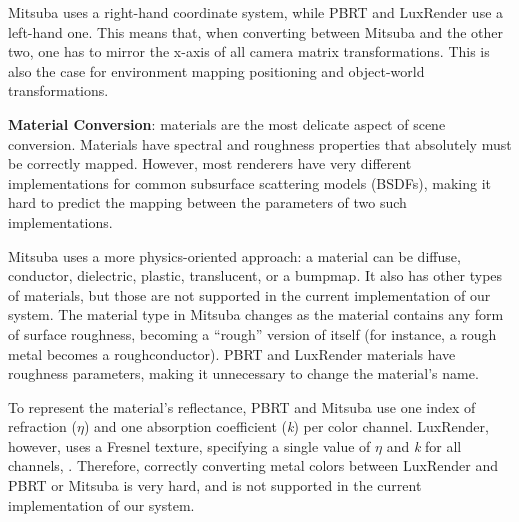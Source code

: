 Mitsuba uses a right-hand coordinate system, while PBRT and LuxRender use a
left-hand one. This means that, when converting between Mitsuba and the other
two, one has to mirror the x-axis of all camera matrix transformations. This is
also the case for environment mapping positioning and object-world
transformations.



\textbf{Material Conversion}: 
materials are the most delicate aspect of scene conversion. Materials have
spectral and roughness properties that absolutely must be correctly mapped. 
However, most renderers have very different implementations
for common subsurface scattering models (BSDFs), making it hard to
predict the mapping between the parameters of two such implementations.

Mitsuba uses a more physics-oriented approach: a material can be diffuse,
conductor, dielectric, plastic, translucent, or a bumpmap.
It also has other types of materials, but those are not supported in the current implementation of our system.
The material type in Mitsuba changes as the material contains any form of
surface roughness, becoming a ``rough'' version of itself (for instance, a rough
metal becomes a roughconductor).
%
PBRT and LuxRender materials have roughness parameters, making it unnecessary to
change the material's name.

To represent the material's reflectance, PBRT and Mitsuba use one index of refraction ($\eta$) and one absorption 
coefficient (\textit{k}) per color channel. 
LuxRender, however, uses a Fresnel texture, specifying a 
single value of $\eta$ and \textit{k} for all channels, . Therefore, correctly converting metal colors between LuxRender and PBRT or Mitsuba is very hard, 
and is not supported in the current implementation of our system.

